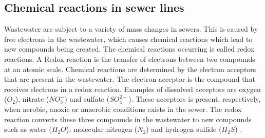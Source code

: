 \subsection{Chemical reactions in sewer lines}\label{subse:chemical_reactions_in_a_sewer}
Wastewater are subject to a variety of mass changes in sewers. This is caused by free electrons in the wastewater, which causes chemical reactions which lead to new compounds being created. %
The chemical reactions occurring is called redox reactions.%
A Redox reaction is the transfer of electrons between two compounds at an atomic scale.
Chemical reactions are determined by the electron acceptors that are present in the wastewater. 
The electron acceptor is the compound that receives electrons in a redox reaction.
Examples of dissolved acceptors are oxygen ($O_2$), nitrate ($NO^-_3$) and sulfate ($SO^{2-}_4$). These acceptors is present, respectively, when aerobic, anoxic or anaerobic conditions exists in the sewer. 
The redox reaction converts these three compounds in the wastewater to new compounds such as water ($H_2O$), molecular nitrogen ($N_2$) and hydrogen sulfide ($H_2S$) \cite{Sewer_processes}. 

